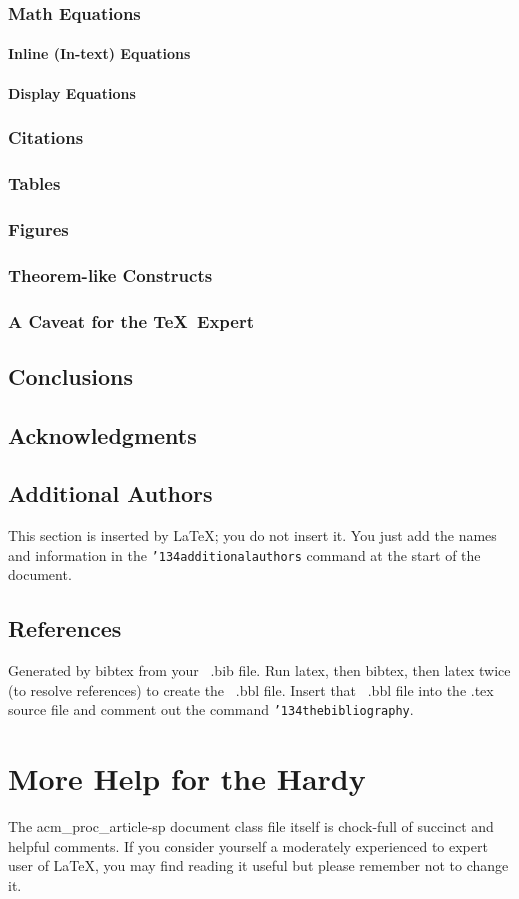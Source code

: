 \documentclass{acm_proc_article-sp}
\begin{document}
\subsubsection{Math Equations}
\paragraph{Inline (In-text) Equations}
\paragraph{Display Equations}
\subsubsection{Citations}
\subsubsection{Tables}
\subsubsection{Figures}
\subsubsection{Theorem-like Constructs}
\subsubsection*{A Caveat for the \TeX\ Expert}
\subsection{Conclusions}
\subsection{Acknowledgments}
\subsection{Additional Authors}
This section is inserted by \LaTeX; you do not insert it.
You just add the names and information in the
\texttt{{\char'134}additionalauthors} command at the start
of the document.
\subsection{References}
Generated by bibtex from your ~.bib file.  Run latex,
then bibtex, then latex twice (to resolve references)
to create the ~.bbl file.  Insert that ~.bbl file into
the .tex source file and comment out
the command \texttt{{\char'134}thebibliography}.
\section{More Help for the Hardy}
The acm\_proc\_article-sp document class file itself is chock-full of succinct
and helpful comments.  If you consider yourself a moderately
experienced to expert user of \LaTeX, you may find reading
it useful but please remember not to change it.
\balancecolumns
\end{document}
